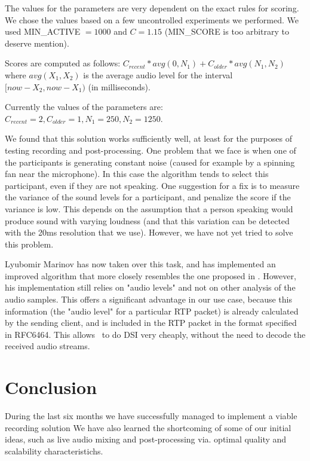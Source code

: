 \documentclass[twoside,openright,a4paper,12pt,english]{article}
\begin{document}
The values for the parameters are very dependent on the exact rules for scoring.
We chose the values based on a few uncontrolled experiments we performed. We used
MIN\_ACTIVE $= 1000$ and $C = 1.15$ (MIN\_SCORE is too arbitrary to deserve mention).

Scores are computed as follows: $C_{recent} * avg(0, N_1) + C_{older} * avg(N_1, N_2)$
where $avg(X_1, X_2)$ is the average audio level for the interval $[now-X_2,
now-X_1)$ (in milliseconds). 

Currently the values of the parameters are: $C_{recent} = 2, C_{older} = 1, N_1 = 250, N_2 = 1250$.


\bigskip
We found that this solution works sufficiently well, at least for the purposes
of testing recording and post-processing. One problem that we face is when
one of the participants is generating constant noise (caused for example by a
spinning fan near the microphone). In this case the algorithm tends to select this participant,
even if they are not speaking. One suggestion for a fix is to measure the
variance of the sound levels for a participant, and penalize the score if the
variance is low. This depends on the assumption that a person speaking would
produce sound with varying loudness (and that this variation can be detected
with the 20ms resolution that we use). However, we have not yet tried to solve
this problem.

Lyubomir Marinov has now taken over this task, and has implemented an improved algorithm that more closely resembles the
one proposed in \cite{volfin2012}. However, his implementation still relies on
"audio levels" and not on other analysis of the audio samples. This offers a significant advantage
in our use case, because this information (the "audio level" for a particular RTP packet) is already
calculated by the sending client, and is included in the RTP packet in the format specified in RFC6464\cite{rfc6464}.
This allows \jvb\ to do DSI very cheaply, without the need to decode the received audio streams.



\section{Conclusion}
\label{conclusion}
During the last six months we have successfully managed to implement a viable recording solution 
We have also learned the shortcoming of some of our initial ideas, such as live audio mixing and post-processing via.
optimal quality and scalability characteristichs. 
\end{document}
